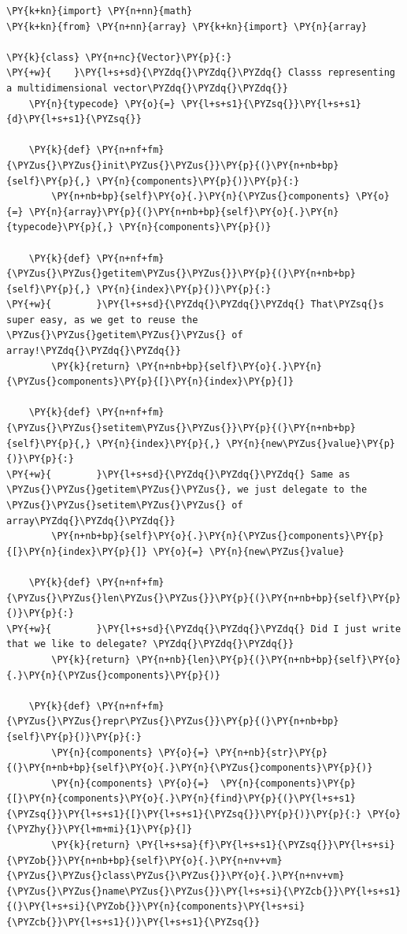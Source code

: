 \begin{Verbatim}[label=\makebox{\url{https://github.com/lucabaldini/cmepda/tree/master/slides/latex/snippets/vector\_random\_access.py}},commandchars=\\\{\}]
\PY{k+kn}{import} \PY{n+nn}{math}
\PY{k+kn}{from} \PY{n+nn}{array} \PY{k+kn}{import} \PY{n}{array}

\PY{k}{class} \PY{n+nc}{Vector}\PY{p}{:}
\PY{+w}{    }\PY{l+s+sd}{\PYZdq{}\PYZdq{}\PYZdq{} Classs representing a multidimensional vector\PYZdq{}\PYZdq{}\PYZdq{}}
    \PY{n}{typecode} \PY{o}{=} \PY{l+s+s1}{\PYZsq{}}\PY{l+s+s1}{d}\PY{l+s+s1}{\PYZsq{}}

    \PY{k}{def} \PY{n+nf+fm}{\PYZus{}\PYZus{}init\PYZus{}\PYZus{}}\PY{p}{(}\PY{n+nb+bp}{self}\PY{p}{,} \PY{n}{components}\PY{p}{)}\PY{p}{:}
        \PY{n+nb+bp}{self}\PY{o}{.}\PY{n}{\PYZus{}components} \PY{o}{=} \PY{n}{array}\PY{p}{(}\PY{n+nb+bp}{self}\PY{o}{.}\PY{n}{typecode}\PY{p}{,} \PY{n}{components}\PY{p}{)}

    \PY{k}{def} \PY{n+nf+fm}{\PYZus{}\PYZus{}getitem\PYZus{}\PYZus{}}\PY{p}{(}\PY{n+nb+bp}{self}\PY{p}{,} \PY{n}{index}\PY{p}{)}\PY{p}{:}
\PY{+w}{        }\PY{l+s+sd}{\PYZdq{}\PYZdq{}\PYZdq{} That\PYZsq{}s super easy, as we get to reuse the \PYZus{}\PYZus{}getitem\PYZus{}\PYZus{} of array!\PYZdq{}\PYZdq{}\PYZdq{}}
        \PY{k}{return} \PY{n+nb+bp}{self}\PY{o}{.}\PY{n}{\PYZus{}components}\PY{p}{[}\PY{n}{index}\PY{p}{]}

    \PY{k}{def} \PY{n+nf+fm}{\PYZus{}\PYZus{}setitem\PYZus{}\PYZus{}}\PY{p}{(}\PY{n+nb+bp}{self}\PY{p}{,} \PY{n}{index}\PY{p}{,} \PY{n}{new\PYZus{}value}\PY{p}{)}\PY{p}{:}
\PY{+w}{        }\PY{l+s+sd}{\PYZdq{}\PYZdq{}\PYZdq{} Same as \PYZus{}\PYZus{}getitem\PYZus{}\PYZus{}, we just delegate to the \PYZus{}\PYZus{}setitem\PYZus{}\PYZus{} of array\PYZdq{}\PYZdq{}\PYZdq{}}
        \PY{n+nb+bp}{self}\PY{o}{.}\PY{n}{\PYZus{}components}\PY{p}{[}\PY{n}{index}\PY{p}{]} \PY{o}{=} \PY{n}{new\PYZus{}value}

    \PY{k}{def} \PY{n+nf+fm}{\PYZus{}\PYZus{}len\PYZus{}\PYZus{}}\PY{p}{(}\PY{n+nb+bp}{self}\PY{p}{)}\PY{p}{:}
\PY{+w}{        }\PY{l+s+sd}{\PYZdq{}\PYZdq{}\PYZdq{} Did I just write that we like to delegate? \PYZdq{}\PYZdq{}\PYZdq{}}
        \PY{k}{return} \PY{n+nb}{len}\PY{p}{(}\PY{n+nb+bp}{self}\PY{o}{.}\PY{n}{\PYZus{}components}\PY{p}{)}

    \PY{k}{def} \PY{n+nf+fm}{\PYZus{}\PYZus{}repr\PYZus{}\PYZus{}}\PY{p}{(}\PY{n+nb+bp}{self}\PY{p}{)}\PY{p}{:}
        \PY{n}{components} \PY{o}{=} \PY{n+nb}{str}\PY{p}{(}\PY{n+nb+bp}{self}\PY{o}{.}\PY{n}{\PYZus{}components}\PY{p}{)}
        \PY{n}{components} \PY{o}{=}  \PY{n}{components}\PY{p}{[}\PY{n}{components}\PY{o}{.}\PY{n}{find}\PY{p}{(}\PY{l+s+s1}{\PYZsq{}}\PY{l+s+s1}{[}\PY{l+s+s1}{\PYZsq{}}\PY{p}{)}\PY{p}{:} \PY{o}{\PYZhy{}}\PY{l+m+mi}{1}\PY{p}{]}
        \PY{k}{return} \PY{l+s+sa}{f}\PY{l+s+s1}{\PYZsq{}}\PY{l+s+si}{\PYZob{}}\PY{n+nb+bp}{self}\PY{o}{.}\PY{n+nv+vm}{\PYZus{}\PYZus{}class\PYZus{}\PYZus{}}\PY{o}{.}\PY{n+nv+vm}{\PYZus{}\PYZus{}name\PYZus{}\PYZus{}}\PY{l+s+si}{\PYZcb{}}\PY{l+s+s1}{(}\PY{l+s+si}{\PYZob{}}\PY{n}{components}\PY{l+s+si}{\PYZcb{}}\PY{l+s+s1}{)}\PY{l+s+s1}{\PYZsq{}}
\end{Verbatim}